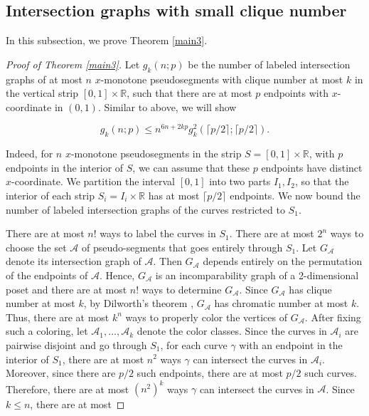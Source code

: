\documentclass[11pt]{article}
\theoremstyle{plain}
\theoremstyle{definition}
\theoremstyle{remark}
\begin{document}
    

\subsection{Intersection graphs with small clique number}\label{secbip1}

In this subsection, we prove Theorem \ref{main3}.  




\begin{proof}[Proof of Theorem \ref{main3}]
 Let $g_k(n;p)$ be the number of labeled intersection graphs of at most $n$ $x$-monotone pseudosegments with clique number at most $k$ in the vertical strip $[0,1]\times \mathbb{R}$, such that there are at most $p$ endpoints with $x$-coordinate in $(0,1)$.   Similar to above, we will show 
 
$$g_k(n;p) \leq n^{6n + 2kp}g^2_k(\lceil p/2\rceil;\lceil p/2\rceil).$$
 


Indeed, for $n$ $x$-monotone pseudosegments in the strip $S = [0,1]\times \mathbb{R}$, with $p$ endpoints in the interior of $S$, we can assume that these $p$ endpoints have distinct $x$-coordinate. We partition the interval $[0,1]$ into two parts $I_1,I_2$, so that the interior of each strip $S_i = I_i\times \mathbb{R}$ has at most $ \lceil p/2\rceil$ endpoints.  We now bound the number of labeled intersection graphs of the curves restricted to $S_1$.



 There are at most $n!$ ways to label the curves in $S_1$.  There are at most $2^n$ ways to choose the set $\mathcal{A}$ of pseudo-segments that goes entirely through $S_1$.  Let $G_{\mathcal{A}}$ denote its intersection graph of $\mathcal{A}$.  Then $G_{\mathcal{A}}$ depends entirely on the permutation of the endpoints of $\mathcal{A}$. 
 Hence, $G_{\mathcal{A}}$ is an incomparability graph of a 2-dimensional poset and there are at most $n!$ ways to determine $G_{\mathcal{A}}$. Since $G_{\mathcal{A}}$ has clique number at most $k$, by Dilworth's theorem \cite{d}, $G_{\mathcal{A}}$ has chromatic number at most $k$.  Thus, there are at most $k^n$ ways to properly color the vertices of $G_{\mathcal{A}}$.  After fixing such a coloring, let $\mathcal{A}_1,\ldots, \mathcal{A}_k$ denote the color classes.  Since the curves in $\mathcal{A}_i$ are pairwise disjoint and go through $S_1$, for each curve $\gamma$ with an endpoint in the interior of $S_1$, there are at most $n^2$ ways $\gamma$ can intersect the curves in $\mathcal{A}_i$.  Moreover, since there are $p/2$ such endpoints, there are at most $p/2$ such curves. Therefore, there are at most $(n^2)^k$ ways $\gamma$ can intersect the curves in $\mathcal{A}$.   Since $k\leq n$, there are at most
 

\end{proof}
\end{document}
